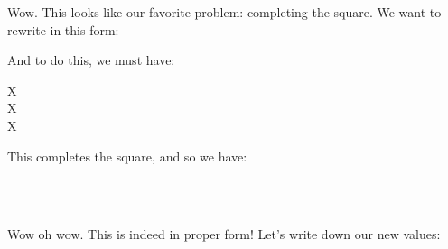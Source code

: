 Wow. This looks like our favorite problem: completing the square. We
want to rewrite in this form:

\begin{nedqn}
\end{nedqn}

And to do this, we must have:

\begin{nedqn}
  \vmux
  \parensqrt{
    \covmtxmux\invx + \covmtxx\invx
  }
  X
\eqcol
  \vmux\tran
  \parens{
    \covmtxmux\invx \vmux
    +
    \covmtxx\invx \vx
  }
  \\
  X
\eqcol
  \parensnegsqrt{
    \covmtxmux\invx + \covmtxx\invx
  }
  \vmux\invx
  \vmux\tran
  \parens{
    \covmtxmux\invx \vmux
    +
    \covmtxx\invx \vx
  }
  \\
  X
\eqcol
  \parensnegsqrt{
    \covmtxmux\invx + \covmtxx\invx
  }
  \parens{
    \covmtxmux\invx \vmux
    +
    \covmtxx\invx \vx
  }
\end{nedqn}

This completes the square, and so we have:

\begin{nedqn}
  \log \cpvmuxx
\simcol
  \\
\eqcol
  \normsq{
    \parensqrt{
      \covmtxmux\invx + \covmtxx\invx
    }
    \vmux
    -
    {
      \parensnegsqrt{
        \covmtxmux\invx + \covmtxx\invx
      }
      \parens{
        \covmtxmux\invx \vmux
        +
        \covmtxx\invx \vx
      }
    }
  }
  \\
\eqcol
  \normsq{
    \parensqrt{
      \covmtxmux\invx + \covmtxx\invx
    }
    \sqbrackets{
      \vmux
      -
      {
        \parensinv{
          \covmtxmux\invx + \covmtxx\invx
        }
        \parens{
          \covmtxmux\invx \vmux
          +
          \covmtxx\invx \vx
        }
      }
    }
  }
\end{nedqn}

Wow oh wow. This is indeed in proper form! Let's write down our new
values:

\begin{nedqn}
  \covmtxp\subvmux
\eqcol
  \parensinv{
    \covmtxmux\invx
    +
    \covmtxx\invx
  }
\\
  \vmumuxp
\eqcol
  \covmtxp\subvmux
  \parens{
    \covmtxmux\invx \vmux
    +
    \covmtxx\invx \vx
  }
\end{nedqn}

